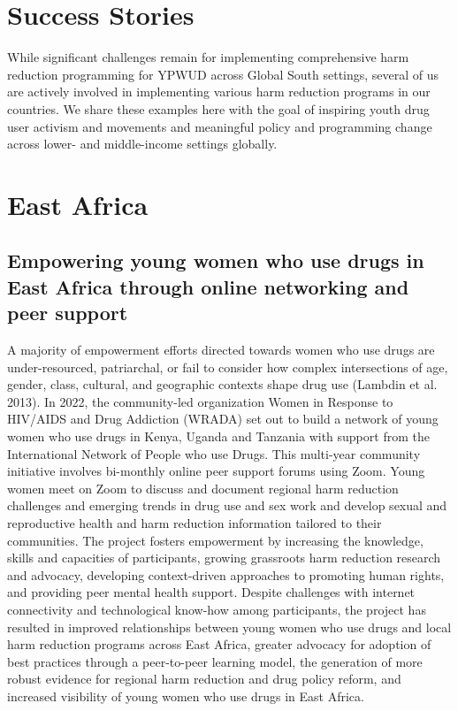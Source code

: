 \documentclass[
  letterpaper,
  DIV=11,
  numbers=noendperiod]{scrartcl}
\begin{document}
\section{Success Stories}\label{sec-success}

While significant challenges remain for implementing comprehensive harm
reduction programming for YPWUD across Global South settings, several of
us are actively involved in implementing various harm reduction programs
in our countries. We share these examples here with the goal of
inspiring youth drug user activism and movements and meaningful policy
and programming change across lower- and middle-income settings
globally.

\section{East Africa}

\subsection{Empowering young women who use drugs in East Africa through
online networking and peer
support}\label{empowering-young-women-who-use-drugs-in-east-africa-through-online-networking-and-peer-support}

A majority of empowerment efforts directed towards women who use drugs
are under-resourced, patriarchal, or fail to consider how complex
intersections of age, gender, class, cultural, and geographic contexts
shape drug use (Lambdin et al. 2013). In 2022, the community-led
organization Women in Response to HIV/AIDS and Drug Addiction (WRADA)
set out to build a network of young women who use drugs in Kenya, Uganda
and Tanzania with support from the International Network of People who
use Drugs. This multi-year community initiative involves bi-monthly
online peer support forums using Zoom. Young women meet on Zoom to
discuss and document regional harm reduction challenges and emerging
trends in drug use and sex work and develop sexual and reproductive
health and harm reduction information tailored to their communities. The
project fosters empowerment by increasing the knowledge, skills and
capacities of participants, growing grassroots harm reduction research
and advocacy, developing context-driven approaches to promoting human
rights, and providing peer mental health support. Despite challenges
with internet connectivity and technological know-how among
participants, the project has resulted in improved relationships between
young women who use drugs and local harm reduction programs across East
Africa, greater advocacy for adoption of best practices through a
peer-to-peer learning model, the generation of more robust evidence for
regional harm reduction and drug policy reform, and increased visibility
of young women who use drugs in East Africa.
\end{document}
